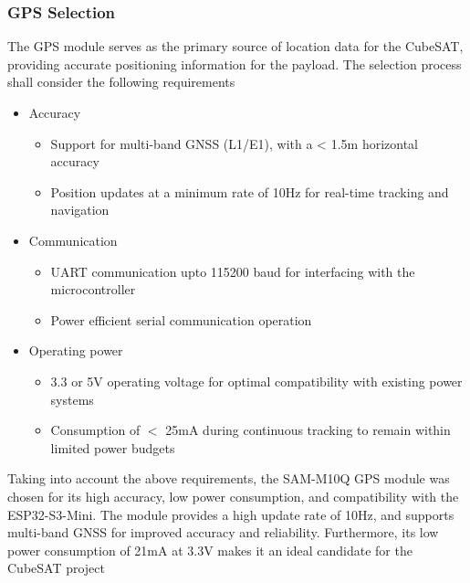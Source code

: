 \documentclass{report}
\begin{document}
                \subsubsection{GPS Selection}
                    The GPS module serves as the primary source of location data for the
                    CubeSAT, providing accurate positioning information for the payload. 
                    The selection process shall consider the following requirements
                    \begin{itemize}
                        \item Accuracy
                        \begin{itemize}
                            \item Support for multi-band GNSS (L1/E1), with a < 1.5m horizontal accuracy
                            \item Position updates at a minimum rate of 10Hz for real-time tracking and navigation
                        \end{itemize}
                        \item Communication
                        \begin{itemize}
                            \item UART communication upto 115200 baud for interfacing with the microcontroller
                            \item Power efficient serial communication operation
                        \end{itemize}
                        \item Operating power
                        \begin{itemize}
                            \item 3.3 or 5V operating voltage for optimal compatibility with existing power systems
                            \item Consumption of $<$ 25mA during continuous tracking to remain within limited power budgets
                        \end{itemize}
                    \end{itemize}
                    Taking into account the above requirements, the SAM-M10Q GPS module was chosen 
                    for its high accuracy, low power consumption, and compatibility with the ESP32-S3-Mini.
                    The module provides a high update rate of 10Hz, and supports multi-band GNSS for
                    improved accuracy and reliability. Furthermore, its low power consumption of 21mA at 3.3V
                    makes it an ideal candidate for the CubeSAT project \cite{sammdatasheet}
\end{document}
